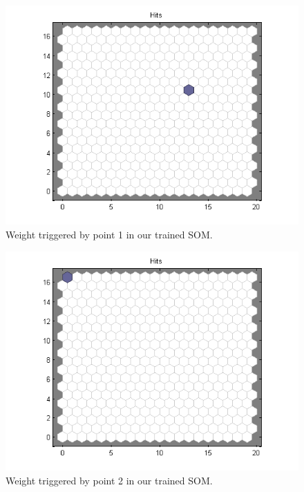 \documentclass[a4paper]{article}
\begin{document}
 \begin{figure}[H] %
	 \includegraphics[scale=0.5]{point1.png}
	 \caption{\label{fig:point1} Weight triggered by point 1 in our trained SOM.}
 \end{figure}
 \begin{figure}[H] %
	 \includegraphics[scale=0.5]{point2.png}
	 \caption{\label{fig:point2} Weight triggered by point 2 in our trained SOM.}
 \end{figure}
\end{document}
